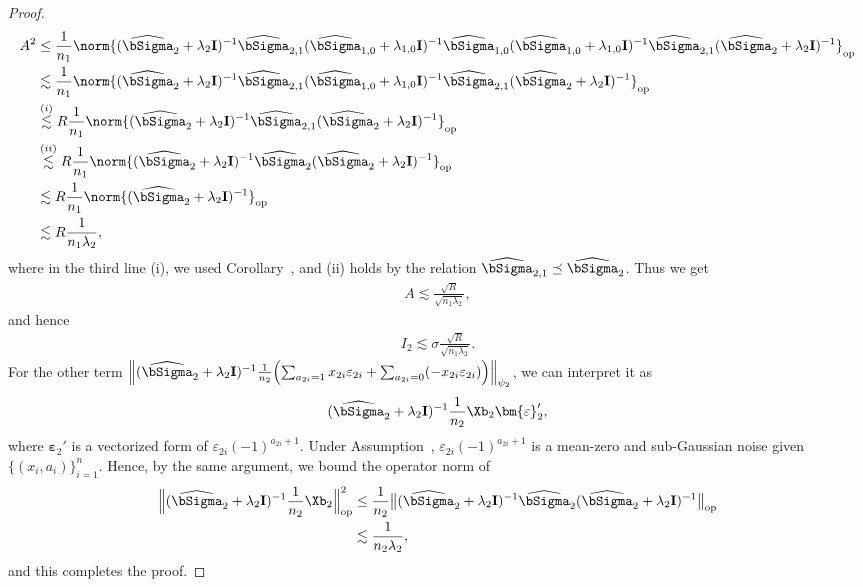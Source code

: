 \documentclass[12pt,a4paper,pdftex,onepage]{article}
\newcommand{\Sighat}{\widehat{{\bSigma}}}
\newcommand{\op}{\operatorname{op}}
\newcommand{\sig}{\sigma}
\begin{document}
\begin{proof}
\begin{align*}
A^2 & \leq \frac{1}{n_1} \norm{(\Sighat_2 + \lambda_2 \mathbf{I})^{-1}  \Sighat_{2,1} (\Sighat_{1,0}+\lambda_{1,0} \mathbf{I})^{-1} \Sighat_{1,0}(\Sighat_{1,0}+\lambda_{1,0} \mathbf{I})^{-1} \Sighat_{2,1}  (\Sighat_2 + \lambda_2 \mathbf{I})^{-1}  }_{\op}  \\
&\lesssim \frac{1}{n_1} \norm{(\Sighat_2 + \lambda_2 \mathbf{I})^{-1}  \Sighat_{2,1} (\Sighat_{1,0}+\lambda_{1,0} \mathbf{I})^{-1}  \Sighat_{2,1} (\Sighat_2 + \lambda_2 \mathbf{I})^{-1} }_{\op} \\
&\stackrel{(i)}{\lesssim } R  \frac{1}{n_1} \norm{(\Sighat_2 + \lambda_2 \mathbf{I})^{-1}  \Sighat_{2,1}   (\Sighat_2 + \lambda_2 \mathbf{I})^{-1}  }_{\op}\\
&\stackrel{(ii)}{\lesssim } R  \frac{1}{n_1} \norm{(\Sighat_2 + \lambda_2 \mathbf{I})^{-1}  \Sighat_{2}   (\Sighat_2 + \lambda_2 \mathbf{I})^{-1}  }_{\op} \\
&\lesssim  R  \frac{1}{n_1} \norm{(\Sighat_2 + \lambda_2 \mathbf{I})^{-1}   }_{\op}\\
&\lesssim R  \frac{1}{n_1 \lambda_2},
\end{align*}
where in the third line (i), we used Corollary~, and (ii) holds by the relation $\Sighat_{2,1} \preceq \Sighat_2$.
Thus we get
\begin{align*}
A \lesssim \frac{ \sqrt{R}}{\sqrt{n_1 \lambda_2}},
\end{align*}    
and hence
\begin{align*}
I_2 \lesssim \sig \frac{ \sqrt{R}}{\sqrt{n_1 \lambda_2}}.
\end{align*}
For the other term \(\Bigl\| (\Sighat_2 + \lambda_2 \mathbf{I})^{-1} \frac{1}{n_2}\Bigl(  \sum_{a_{2i}=1}x_{2i}\varepsilon_{2i}+\sum_{a_{2i}=0} (- x_{2i}\varepsilon_{2i}) \Bigr) \Bigr\|_{\psi_2}\), we can interpret it as 
\begin{align*}
(\Sighat_2 + \lambda_2 \mathbf{I})^{-1} \frac{1}{n_2} \Xb_2 \bm{\varepsilon}'_2 ,
\end{align*}
where \(\bm{\varepsilon}_2' \) is a vectorized form of \(\varepsilon_{2i}(-1)^{a_{2i}+1}\).
Under Assumption~, \(\varepsilon_{2i}(-1)^{a_{2i}+1}\) is a mean-zero and sub-Gaussian noise given \(\{(x_i,a_i)\}_{i=1}^n\).
Hence, by the same argument, we bound the operator norm of 
\begin{align*}
\Bigl\| (\Sighat_2 + \lambda_2 \mathbf{I})^{-1} \frac{1}{n_2} \Xb_2  \Bigr\|^2_{\op} &\leq \frac{1}{n_2 } \bigl\|(\Sighat_2 + \lambda_2 \mathbf{I})^{-1}\Sighat_2(\Sighat_2 + \lambda_2 \mathbf{I})^{-1} \bigr\|_{\op} \\
&\lesssim \frac{1}{n_2\lambda_2},
\end{align*}
and this completes the proof.
\end{proof}
\end{document}
